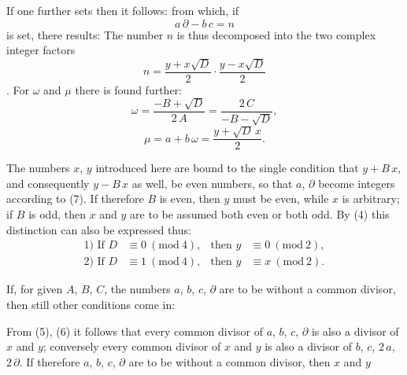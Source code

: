 If one further sets
then it follows:
from which, if
\[
a\,\partial - b\,c = n
\]
is set, there results:
The number $n$ is thus decomposed into the two complex integer factors
\[
n = \frac{y+x\sqrt{D}}{2}\cdot\frac{y-x\sqrt{D}}{2}
\].
For $\omega$ and $\mu$ there is found further:
\[
\omega = \frac{-B+\sqrt{D}}{2\,A} = \frac{2\,C}{-B-\sqrt{D}},
\]
\[
\mu = a+b\,\omega = \frac{y+\sqrt{D}\,x}{2}.
\]

The numbers $x$, $y$ introduced here are bound to the single condition
that $y+B\,x$, and consequently $y-B\,x$ as well, be even numbers, so
that $a$, $\partial$ become integers according to (7). If therefore $B$
is even, then $y$ must be even, while $x$ is arbitrary; if $B$ is odd,
then $x$ and $y$ are to be assumed both even or both odd. By (4) this
distinction can also be expressed thus:
\[
\begin{aligned}
\text{1) If }D&\equiv0\ (\mathrm{mod}\ 4), &\text{then }y&\equiv0\ (\mathrm{mod}\ 2),\\
\text{2) If }D&\equiv1\ (\mathrm{mod}\ 4), &\text{then }y&\equiv x\ (\mathrm{mod}\ 2).
\end{aligned}
\]

If, for given $A$, $B$, $C$, the numbers $a$, $b$, $c$, $\partial$ are to
be without a common divisor, then still other conditions come in:

From (5), (6) it follows that every common divisor of $a$, $b$, $c$,
$\partial$ is also a divisor of $x$ and $y$; conversely every common
divisor of $x$ and $y$ is also a divisor of $b$, $c$, $2\,a$,
$2\,\partial$. If therefore $a$, $b$, $c$, $\partial$ are to be without a
common divisor, then $x$ and $y$
